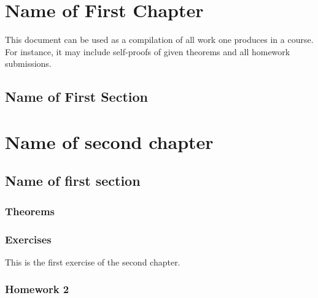 \documentclass[11pt, a4paper]{book}
\begin{document}
%

%
\tableofcontents
\thispagestyle{empty}
\newpage
\setcounter{page}{1}
%
\chapter{Name of First Chapter}
This document can be used as a compilation of all work one produces in a course. For instance, it may include self-proofs of given theorems and all homework submissions.
%
\section{Name of First Section}
%
\chapter{Name of second chapter}
%
\section{Name of first section}
\subsection{Theorems}
\subsection{Exercises}
\begin{exercise}
    This is the first exercise of the second chapter.
\end{exercise}
\subsection{Homework 2}
\end{document}
